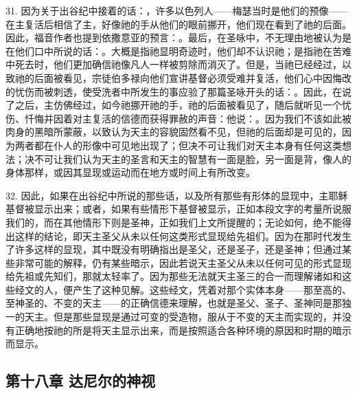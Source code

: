 31. 因为关于出谷纪中接着的话：，许多以色列人——梅瑟当时是他们的预像——在主复活后相信了主，好像祂的手从他们的眼前挪开，他们现在看到了祂的后面。因此，福音作者也提到依撒意亚的预言：。最后，在圣咏中，不无理由地被认为是在他们口中所说的话：。大概是指祂显明奇迹时，他们却不认识祂；是指祂在苦难中死去时，他们更加确信祂像凡人一样被剪除而消灭了。但是，当祂已经经过，以致祂的后面被看见，宗徒伯多禄向他们宣讲基督必须受难并复活，他们心中因悔改的忧伤而被刺透，使受洗者中所发生的事应验了那篇圣咏开头的话：。因此，在说了之后，主仿佛经过，如今祂挪开祂的手，祂的后面被看见了，随后就听见一个忧伤、忏悔并因着对主复活的信德而获得罪赦的声音：他说：。因为我们不该如此被肉身的黑暗所蒙蔽，以致认为天主的容貌固然看不见，但祂的后面却是可见的，因为两者都在仆人的形像中可见地出现了；但决不可让我们对天主本身有任何这类想法；决不可让我们认为天主的圣言和天主的智慧有一面是脸，另一面是背，像人的身体那样，或因其显现或运动而在地方或时间上有所改变。\par

32. 因此，如果在出谷纪中所说的那些话，以及所有那些有形体的显现中，主耶稣基督被显示出来；或者，如果有些情形下基督被显示，正如本段文字的考量所说服我们的，而在其他情形下则是圣神，正如我们上文所提醒的；无论如何，绝不能得出这样的结论，即天主圣父从未以任何这类形式显现给先祖们。因为在那时代发生了许多这样的显现，其中既没有明确指出是圣父，还是圣子，还是圣神；但通过某些非常可能的解释，仍有某些暗示，因此若说天主圣父从未以任何可见的形式显现给先祖或先知们，那就太轻率了。因为那些无法就天主圣三的合一而理解诸如和这些经文的人，便产生了这种见解。这些经文，凭着对那个实体本身——那至高的、至神圣的、不变的天主——的正确信德来理解，也就是圣父、圣子、圣神同是那独一的天主。但是那些显现是通过可变的受造物，服从于不变的天主而实现的，并没有正确地按祂的所是将天主显示出来，而是按照适合各种环境的原因和时期的暗示而显示。\par


\subsection{第十八章 达尼尔的神视}

